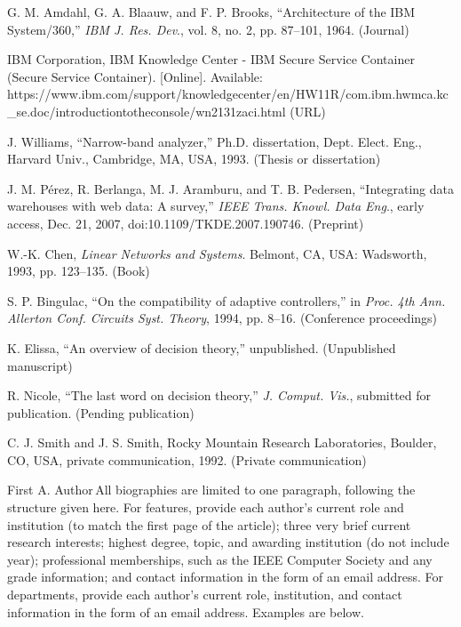 \documentclass{IEEEcsmag}
\begin{document}
\begin{thebibliography}{1}

G. M. Amdahl, G. A. Blaauw, and F. P. Brooks, ``Architecture of the IBM System/360,'' {\it IBM J. Res. Dev}., vol. 8, no. 2, pp. 87--101, 1964. (Journal)

IBM Corporation, IBM Knowledge Center - IBM Secure Service Container (Secure Service Container). [Online]. Available: {https://www.ibm.com/support/\break knowledgecenter/en/HW11R/com.ibm.hwmca.kc\_se.doc/\break introductiontotheconsole/wn2131zaci.html} (URL)

J. Williams, ``Narrow-band analyzer,'' Ph.D. dissertation, Dept.  Elect. Eng., Harvard Univ., Cambridge, MA, USA, 1993. (Thesis or dissertation)

J. M. P\'erez, R. Berlanga, M. J. Aramburu, and T. B. Pedersen, ``Integrating data warehouses with web data: A survey,'' {\it IEEE Trans. Knowl. Data Eng}., early access, Dec. 21, 2007, doi:10.1109/TKDE.2007.190746. (Preprint)

W.-K. Chen, {\it Linear Networks and Systems}. Belmont, CA, USA: Wadsworth,  1993, pp. 123--135. (Book)

S. P. Bingulac, ``On the compatibility of adaptive controllers,'' in {\it Proc. 4th Ann. Allerton Conf. Circuits Syst. Theory}, 1994,  pp. 8--16. (Conference proceedings)

K. Elissa, ``An overview of decision theory,'' unpublished. (Unpublished manuscript)

R. Nicole, ``The last word on decision theory,'' {\it J. Comput. Vis.}, submitted for publication. (Pending publication)

C. J. Smith and J. S. Smith, Rocky Mountain Research Laboratories, Boulder, CO, USA, private communication, 1992. (Private communication)
\end{thebibliography}\vspace*{-8pt}


\begin{IEEEbiography}{First A. Author}{\,}All biographies are limited to one paragraph, following the structure given here. For features, provide each author's current role and institution (to match the first page of the article); three very brief current research interests; highest degree, topic, and awarding institution (do not include year); professional memberships, such as the IEEE Computer Society and any grade information; and contact information in the form of an email address. For departments, provide each author's current role, institution, and contact information in the form of an email address. Examples are below. \vadjust{\vfill\pagebreak}
\end{IEEEbiography}
\end{document}
